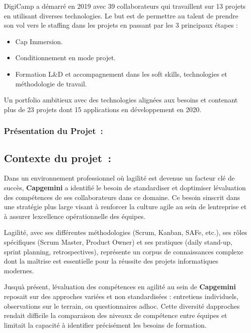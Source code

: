 \documentclass[12pt,a4paper,twoside]{report}
\begin{document}
DigiCamp a démarré en 2019 avec 39 collaborateurs qui travaillent sur 13
projets en utilisant diverses technologies. Le but est de permettre au
talent de prendre son vol vers le staffing dans les projets en passant
par les 3 principaux étapes :

\begin{itemize}
\item
  Cap Immersion.
\item
  Conditionnement en mode projet.
\item
  Formation L\&D et accompagnement dans les soft skills, technologies et
  méthodologie de travail.
\end{itemize}

Un portfolio ambitieux avec des technologies alignées aux besoins et
contenant plus de 23 projets dont 15 applications en développement en
2020.

\hypertarget{pruxe9sentation-du-projet}{%
\subsubsection{Présentation du
Projet~:}\label{pruxe9sentation-du-projet}}

\hypertarget{contexte-du-projet}{%
\subsection{Contexte du projet~:}\label{contexte-du-projet}}

Dans un environnement professionnel où l\textquotesingle agilité est
devenue un facteur clé de succès, \textbf{Capgemini} a identifié le
besoin de standardiser et d\textquotesingle optimiser
l\textquotesingle évaluation des compétences de ses collaborateurs dans
ce domaine. Ce besoin s\textquotesingle inscrit dans une stratégie plus
large visant à renforcer la culture agile au sein de
l\textquotesingle entreprise et à assurer l\textquotesingle excellence
opérationnelle des équipes.

L\textquotesingle agilité, avec ses différentes méthodologies (Scrum,
Kanban, SAFe, etc.), ses rôles spécifiques (Scrum Master, Product Owner)
et ses pratiques (daily stand-up, sprint planning, retrospectives),
représente un corpus de connaissances complexe dont la maîtrise est
essentielle pour la réussite des projets informatiques modernes.

Jusqu\textquotesingle à présent, l\textquotesingle évaluation des
compétences en agilité au sein de \textbf{Capgemini} reposait sur des
approches variées et non standardisées : entretiens individuels,
observations sur le terrain, ou questionnaires adhoc. Cette diversité
d\textquotesingle approches rendait difficile la comparaison des niveaux
de compétence entre équipes et limitait la capacité à identifier
précisément les besoins de formation.
\end{document}
